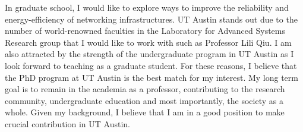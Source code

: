 \documentclass[12pt]{article}
\begin{document}
In graduate school, I would like to explore ways to improve the reliability and energy-efficiency of networking infrastructures. UT Austin stands out due to the number of world-renowned faculties in the Laboratory for Advanced Systems Research group that I would like to work with such as Professor Lili Qiu. I am also attracted by the strength of the undergraduate program in UT Austin as I look forward to teaching as a graduate student. For these reasons, I believe that the PhD program at UT Austin is the best match for my interest. My long term goal is to remain in the academia as a professor, contributing to the research community, undergraduate education and most importantly, the society as a whole. Given my background, I believe that I am in a good position to make crucial contribution in UT Austin. \newline



\end{document}
